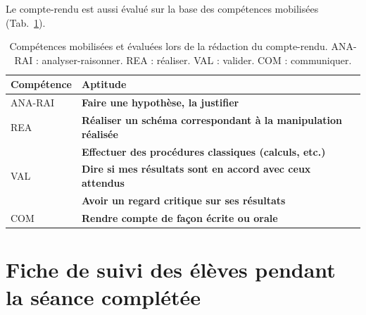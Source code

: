 \documentclass[12pt,a4paper, fleqn]{article}
\newcommand{\rea}{\colorbox{yellow_c}{\textcolor{yellow_f}{REA}}}
\newcommand{\anarai}{\colorbox{green_c}{\textcolor{green_f}{ANA-RAI}}}
\newcommand{\val}{\colorbox{orange_c}{\textcolor{orange_f}{VAL}}}
\newcommand{\com}{\colorbox{red_c}{\textcolor{red_f}{COM}}}
\begin{document}
Le compte-rendu est aussi évalué sur la base des compétences mobilisées (Tab.~\ref{tab:cptces_cr}).

\begin{table}[h]
\center
\begin{tabular}{l|l}
\textbf{Compétence} & \textbf{Aptitude} \\
\hline \hline
\anarai 	& \textbf{Faire une hypothèse, la justifier} \\
\hline
\rea			& \textbf{Réaliser un schéma correspondant à la manipulation réalisée} \\
				& \textbf{Effectuer des procédures classiques (calculs, etc.)} \\
\hline
\val			& \textbf{Dire si mes résultats sont en accord avec ceux attendus} \\
 				& \textbf{Avoir un regard critique sur ses résultats} \\
\hline
\com		& \textbf{Rendre compte de façon écrite ou orale}
\end{tabular}
\caption{Compétences mobilisées et évaluées lors de la rédaction du compte-rendu.
\anarai{} : analyser-raisonner.
\rea{} : réaliser.
\val{} : valider.
\com{} : communiquer.}
\label{tab:cptces_cr}
\end{table}

\section{Fiche de suivi des élèves pendant la séance complétée}
\label{ann:suivi}
\end{document}
